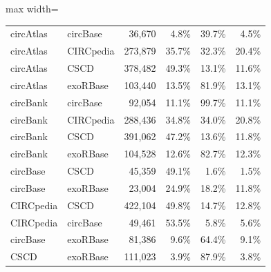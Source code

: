 \begin{table}[ht]
\begin{adjustbox}{max width=\textwidth}
\begin{tabular}{llrrrr}
    circAtlas & circBase & 36,670 & 4.8\% & 39.7\% & 4.5\% \\
    circAtlas & CIRCpedia & 273,879 & 35.7\% & 32.3\% & 20.4\% \\
    circAtlas & CSCD & 378,482 & 49.3\% & 13.1\% & 11.6\% \\
    circAtlas & exoRBase & 103,440 & 13.5\% & 81.9\% & 13.1\% \\
    circBank & circBase & 92,054 & 11.1\% & 99.7\% & 11.1\% \\
    circBank & CIRCpedia & 288,436 & 34.8\% & 34.0\% & 20.8\% \\
    circBank & CSCD & 391,062 & 47.2\% & 13.6\% & 11.8\% \\
    circBank & exoRBase & 104,528 & 12.6\% & 82.7\% & 12.3\% \\
    circBase &CSCD & 45,359 & 49.1\% & 1.6\% & 1.5\% \\
    circBase & exoRBase & 23,004 & 24.9\% & 18.2\% & 11.8\% \\
    CIRCpedia & CSCD & 422,104 & 49.8\% & 14.7\% & 12.8\% \\
    CIRCpedia &  circBase & 49,461 & 53.5\% & 5.8\% & 5.6\% \\
    circBase & exoRBase & 81,386 & 9.6\% & 64.4\% & 9.1\% \\
    CSCD & exoRBase & 111,023 & 3.9\% & 87.9\% & 3.8\% \\
    \bottomrule
  \end{tabular}
  \end{adjustbox}
\end{table}

\clearpage

